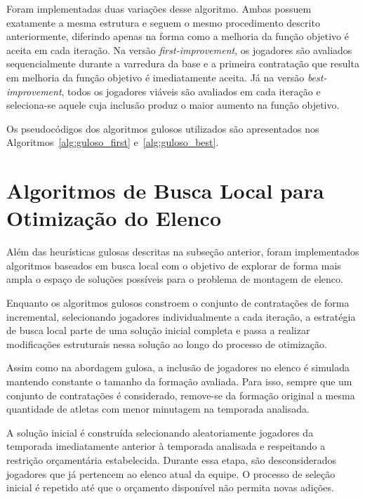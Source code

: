 Foram implementadas duas variações desse algoritmo. Ambas possuem exatamente a mesma estrutura e seguem o mesmo procedimento descrito anteriormente, 
diferindo apenas na forma como a melhoria da função objetivo é aceita em cada iteração. Na versão \textit{first-improvement}, os jogadores são avaliados 
sequencialmente durante a varredura da base e a primeira contratação que resulta em melhoria da função objetivo é imediatamente aceita. 
Já na versão \textit{best-improvement}, todos os jogadores viáveis são avaliados em cada iteração e seleciona-se aquele cuja inclusão 
produz o maior aumento na função objetivo.

Os pseudocódigos dos algoritmos gulosos utilizados são apresentados nos Algoritmos~\ref{alg:guloso_first} e~\ref{alg:guloso_best}.



\FloatBarrier

\section{Algoritmos de Busca Local para Otimização do Elenco}

Além das heurísticas gulosas descritas na subseção anterior, foram implementados algoritmos baseados em busca local com o objetivo de explorar de 
forma mais ampla o espaço de soluções possíveis para o problema de montagem de elenco.

Enquanto os algoritmos gulosos constroem o conjunto de contratações de forma incremental, selecionando jogadores individualmente a cada iteração, 
a estratégia de busca local parte de uma solução inicial completa e passa a realizar modificações estruturais nessa solução ao longo do processo de otimização.

Assim como na abordagem gulosa, a inclusão de jogadores no elenco é simulada mantendo constante o tamanho da formação avaliada. Para isso, 
sempre que um conjunto de contratações é considerado, remove-se da formação original a mesma quantidade de atletas com menor minutagem na temporada analisada.

A solução inicial é construída selecionando aleatoriamente jogadores da temporada imediatamente anterior à temporada analisada e respeitando a restrição 
orçamentária estabelecida. Durante essa etapa, são desconsiderados jogadores que já pertencem ao elenco atual da equipe. O processo de seleção inicial 
é repetido até que o orçamento disponível não permita novas adições.

